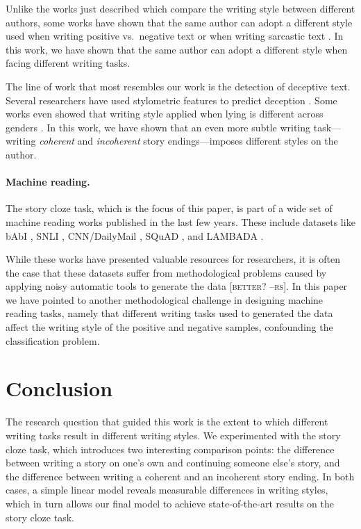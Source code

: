 \documentclass[11pt,a4paper]{article}
\newcommand{\isectionb}[1]{\section{#1}\label{ssec:#1}}
\newcommand{\resolved}[1]{}
\newcommand{\roy}[1]{{\color{orange}\textsc{[#1 --rs]}}}
\newcommand{\nascomment}[1]{{\color{blue}\textsc{[#1 --nas]}}}
\begin{document}
Unlike the works just described which compare the writing style
between different authors, some works have shown that the same author
can adopt a different style used when writing positive vs.~negative
text \cite{Davidov:2010} or when writing sarcastic text \cite{Tsur:2010}. In this work, we have shown that the same author can adopt a different style when facing different writing tasks.

The line of work that most resembles our work is the detection of deceptive text. 
Several researchers have used stylometric features to  predict deception 
\cite{Newman:2003,hancock2007lying,ott2011finding,Feng:2012}.
Some works even showed that writing style applied when lying is different across genders \cite{Perez:2014a,Perez:2014b}.
In this work, we have shown that an even more subtle writing task---writing {\it coherent} and {\it incoherent} story endings---imposes different styles on the author.


\paragraph{Machine reading.}
The  story cloze task, which is the focus of this paper, is part of a wide set of machine reading works published in the last few years.
These include datasets like bAbI \cite{Weston:2015}, SNLI \cite{bowman2015large}, CNN/DailyMail \cite{hermann2015teaching}, SQuAD \cite{rajpurkar2016squad}, and LAMBADA \cite{Paperno:2016}. 

While these works have presented valuable resources for researchers, 
it is often the case that these datasets suffer from methodological
problems caused by applying noisy automatic tools to generate the data\resolved{ \nascomment{this is not clear to me, what does it mean?} when generating the datasets} \roy{better?}\cite{Chen:2016}. 
In this paper we have pointed to another methodological challenge in
designing machine reading tasks, namely that different writing tasks
used to generated the data affect the writing style of the positive
and negative samples, confounding the classification problem.
 \resolved{\nascomment{dropped the train/test discrepancy here}}

\isectionb{Conclusion}

The research question that guided this work is the extent to which different writing tasks result in different writing styles.
We experimented with the story cloze task, which introduces two interesting comparison points: %
 the difference between writing a story on one's own and continuing someone else's story,
 and the difference between writing a coherent and an incoherent story ending.
In both cases, a simple linear model reveals measurable differences in writing styles, %
which in turn allows our final 
model to achieve state-of-the-art results on the story cloze task.
\end{document}
